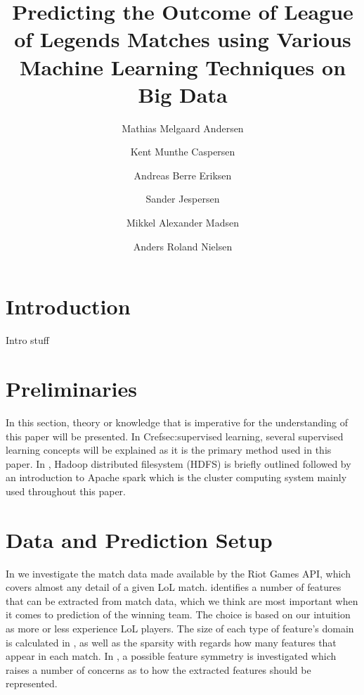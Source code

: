 \documentclass[columns=,boxcolor=white]{datart}
\title{Predicting the Outcome of League of Legends Matches using Various Machine Learning Techniques on Big Data}
\date{}
\author{Mathias Melgaard Andersen}
\author{Kent Munthe Caspersen}
\author{Andreas Berre Eriksen}
\author{Sander Jespersen}
\author{Mikkel Alexander Madsen}
\author{Anders Roland Nielsen}
\affil{Department of Computer Science, Aalborg University}
\begin{document}
\usetikzlibrary{arrows,intersections,shapes.geometric,calc}
\maketitle




\section{Introduction}\label{sec:intro}
Intro stuff





\section{Preliminaries}\label{sec:prelim}
In this section, theory or knowledge that is imperative for the understanding of this paper will be presented. In Cref{sec:supervised learning}, several supervised learning concepts will be explained as it is the primary method used in this paper. In , Hadoop distributed filesystem (HDFS) is briefly outlined followed by an introduction to Apache spark which is the cluster computing system mainly used throughout this paper.




\section{Data and Prediction Setup}\label{sec:features}
In  we investigate the match data made available by the Riot Games API, which covers almost any detail of a given LoL match.
 identifies a number of features that can be extracted from match data, which we think are most important when it comes to prediction of the winning team. The choice is based on our intuition as more or less experience LoL players. The size of each type of feature's domain is calculated in , as well as the sparsity with regards how many features that appear in each match.
In , a possible feature symmetry is investigated which raises a number of concerns as to how the extracted features should be represented. 



\end{document}
